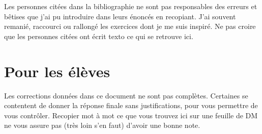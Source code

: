 \begin{remark}
    Les personnes citées dans la bibliographie ne sont pas responsables des erreurs et bêtises que j'ai pu introduire dans leurs énoncés en recopiant. J'ai souvent remanié, raccourci ou rallongé les exercices dont je me suis inspiré. Ne pas croire que les personnes citées ont écrit texto ce qui se retrouve ici.
\end{remark}




\section*{Pour les élèves}

Les corrections données dans ce document ne sont pas complètes. Certaines se contentent de donner la réponse finale sans justifications, pour vous permettre de vous contrôler. Recopier mot à mot ce que vous trouvez ici sur une feuille de DM ne vous assure pas (très loin s'en faut) d'avoir une bonne note.
